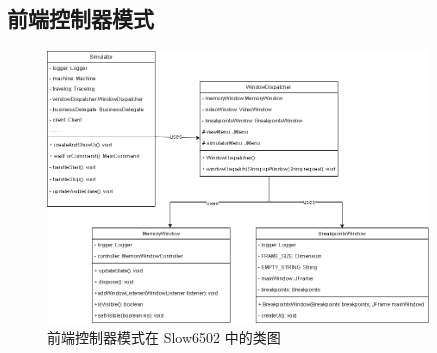\subsection{前端控制器模式}

\begin{figure}[htb]
  \centering
  \includegraphics[width=0.9\textwidth]{figures/前端控制器模式.png}
  \caption{前端控制器模式在 Slow6502 中的类图}
\end{figure}